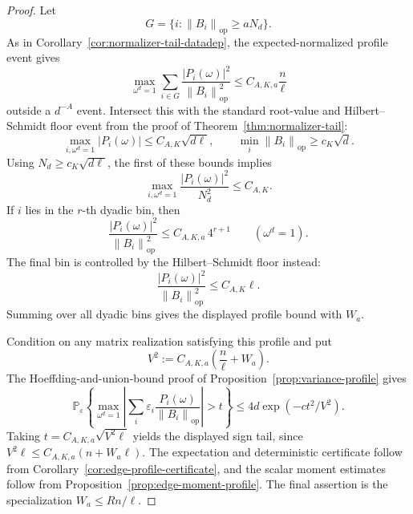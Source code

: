 \documentclass[11pt]{amsart}
\numberwithin{equation}{section}
\theoremstyle{definition}
\theoremstyle{remark}
\newcommand{\op}{\mathrm{op}}
\newcommand{\Prob}{\mathbb P}
\newcommand{\norm}[1]{\left\lVert #1\right\rVert}
\newcommand{\abs}[1]{\left\lvert #1\right\rvert}
\newcommand{\eps}{\varepsilon}
\begin{document}
\begin{proof}
Let
\[
  G=\{i:\norm{B_i}_{\op}\ge aN_d\}.
\]
As in Corollary~\ref{cor:normalizer-tail-datadep}, the expected-normalized
profile event gives
\[
  \max_{\omega^d=1}\sum_{i\in G}
  \frac{\abs{P_i(\omega)}^2}{\norm{B_i}_{\op}^2}
  \le C_{A,K,a}\frac n\ell
\]
outside a \(d^{-A}\) event.  Intersect this with the standard root-value and
Hilbert--Schmidt floor event from the proof of
Theorem~\ref{thm:normalizer-tail}:
\[
  \max_{i,\omega^d=1}\abs{P_i(\omega)}\le C_{A,K}\sqrt{d\ell},
  \qquad
  \min_i\norm{B_i}_{\op}\ge c_K\sqrt d .
\]
Using \(N_d\ge c_K\sqrt{d\ell}\), the first of these bounds implies
\[
  \max_{i,\omega^d=1}\frac{\abs{P_i(\omega)}^2}{N_d^2}
  \le C_{A,K}.
\]
If \(i\) lies in the \(r\)-th dyadic bin, then
\[
  \frac{\abs{P_i(\omega)}^2}{\norm{B_i}_{\op}^2}
  \le C_{A,K,a}\,4^{r+1}
  \qquad(\omega^d=1).
\]
The final bin is controlled by the Hilbert--Schmidt floor instead:
\[
  \frac{\abs{P_i(\omega)}^2}{\norm{B_i}_{\op}^2}
  \le C_{A,K}\ell .
\]
Summing over all dyadic bins gives the displayed profile bound with \(W_a\).

Condition on any matrix realization satisfying this profile and put
\[
  V^2:=C_{A,K,a}\left(\frac n\ell+W_a\right).
\]
The Hoeffding-and-union-bound proof of Proposition~\ref{prop:variance-profile}
gives
\[
  \Prob_\eps\left\{
  \max_{\omega^d=1}\left|\sum_i\eps_i
  \frac{P_i(\omega)}{\norm{B_i}_{\op}}\right|>t
  \right\}
  \le 4d\exp(-ct^2/V^2).
\]
Taking \(t=C_{A,K,a}\sqrt{V^2\ell}\) yields the displayed sign tail, since
\(V^2\ell\le C_{A,K,a}(n+W_a\ell)\).  The expectation and deterministic
certificate follow from Corollary~\ref{cor:edge-profile-certificate}, and the
scalar moment estimates follow from Proposition~\ref{prop:edge-moment-profile}.
The final assertion is the specialization \(W_a\le Rn/\ell\).
\end{proof}
\end{document}
